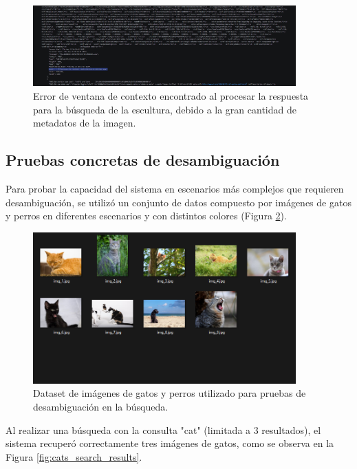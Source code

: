 \begin{figure}[H]
\centering
\includegraphics[width=0.9\textwidth]{archivos/context_window_error.png}
\caption[Error de ventana de contexto en búsqueda]{Error de ventana de contexto encontrado al procesar la respuesta para la búsqueda de la escultura, debido a la gran cantidad de metadatos de la imagen.}
\label{fig:context_window_error_search}
\end{figure}

\subsection{Pruebas concretas de desambiguación}
Para probar la capacidad del sistema en escenarios más complejos que requieren desambiguación, se utilizó un conjunto de datos compuesto por imágenes de gatos y perros en diferentes escenarios y con distintos colores (Figura \ref{fig:cats_dogs_dataset_mixed}).

\begin{figure}[H]
\centering
\includegraphics[width=0.9\textwidth]{archivos/cats_dataset.png} %
\caption[Dataset de gatos y perros para desambiguación]{Dataset de imágenes de gatos y perros utilizado para pruebas de desambiguación en la búsqueda.}
\label{fig:cats_dogs_dataset_mixed}
\end{figure}

Al realizar una búsqueda con la consulta "cat" (limitada a 3 resultados), el sistema recuperó correctamente tres imágenes de gatos, como se observa en la Figura \ref{fig:cats_search_results}.

